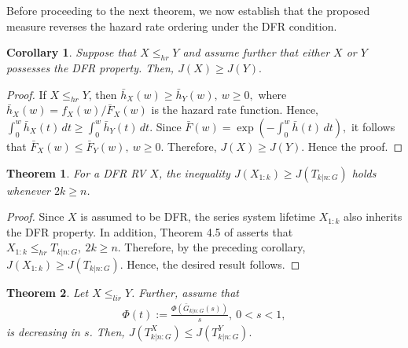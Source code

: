 \documentclass[12pt,a4paper]{article}
\numberwithin{equation}{section}
\newtheorem{theorem}{Theorem}[section]
\newtheorem{c1}{Corollary}[section]
\begin{document}
Before proceeding to the next theorem, we now establish that the proposed measure  reverses the hazard rate ordering under the DFR condition.
\begin{c1}
Suppose that $X\leq_{hr}Y$ and assume further that either $X$ or $Y$ possesses the DFR property. Then, $J(X)\geq J(Y).$
\end{c1}
\begin{proof}
If $X\leq_{hr}Y$, then $\bar h_X(w)\geq \bar h_Y(w),~ w\geq0,$
where $\bar h_X(w)=f_X(w)/\bar F_X(w)$ is the hazard rate function. Hence, $\int_0^w \bar h_X(t)\,dt
\geq
\int_0^w \bar h_Y(t)\,dt .$
Since $\bar F(w)=\exp\!\left(-\int_0^w \bar h(t)\,dt\right),$
it follows that $\bar F_X(w)\leq \bar F_Y(w), ~w\geq0.$
Therefore, $J(X)\geq J(Y).$
Hence the proof.
\end{proof}
\begin{theorem}
For a DFR RV $X$, the inequality
 $J(X_{1:k})
    \geq
    J(T_{k|n:G})$ holds whenever $2k\geq n$.
\end{theorem}
\begin{proof}
Since $X$ is assumed to be DFR, the series system lifetime $X_{1:k}$ also inherits the DFR property. In addition, Theorem 4.5 of \cite{ery2012} asserts that
$X_{1:k}\leq_{hr}T_{k|n:G},
    ~ 2k\geq n.$
Therefore, by the preceding corollary,
$J(X_{1:k})
    \geq
    J(T_{k|n:G}).$
Hence, the desired result follows.
\end{proof}
\begin{theorem}
Let $X\leq_{lir}Y$. Further, assume that
\begin{align*}
    \Phi(t):=
    \frac{\Phi(\bar G_{k|n:G}(s))}{s},~0<s<1,
\end{align*}
is decreasing in $s$. Then, $J(T_{k|n:G}^X)\leq J(T_{k|n:G}^Y).$
\end{theorem}
\end{document}
